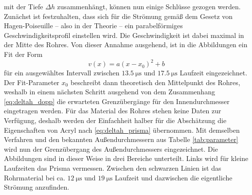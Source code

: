 mit der Tiefe $\Delta h$ zusammenhängt, können nun einige Schlüsse gezogen werden. Zunächst ist festzuhalten, dass sich für die Strömung gemäß dem Gesetz von Hagen-Poiseuille -- also in der Theorie -- ein parabelförmiges Geschwindigkeitsprofil einstellen wird. Die Geschwindigkeit ist dabei maximal in der Mitte des Rohres. Von dieser Annahme ausgehend, ist in die Abbildungen ein Fit der Form
\begin{equation*}
  v(x) = a(x-x_0)^2 + b
\end{equation*}
für ein ausgewähltes Intervall zwischen $\SI{13,5}{\micro\second}$ und $\SI{17,5}{\micro\second}$ Laufzeit eingezeichnet. Der Fit-Parameter $x_0$ beschreibt dann theoretisch den Mittelpunkt des Rohres, weshalb in einem nächsten Schritt ausgehend von dem Zusammenhang \eqref{eq:deltah_dopp} die erwarteten Grenzübergänge für den Innendurchmesser eingetragen werden. Für das Material des Rohres stehen keine Daten zur Verfügung, deshalb werden der Einfachheit halber für die Abschätzung die Eigenschaften von Acryl nach \eqref{eq:deltah_prisma} übernommen. Mit demselben Verfahren und den bekannten Außendurchmessern aus Tabelle \ref{tab:parameter} wird nun der Grenzübergang des Außendurchmessers eingezeichnet.
Die Abbildungen sind in dieser Weise in drei Bereiche unterteilt. Links wird für kleine Laufzeiten das Prisma vermessen. Zwischen den schwarzen Linien ist das Rohrmaterial bei ca. $\SI{12}{\micro\second}$ und $\SI{19}{\micro\second}$ Laufzeit und dazwischen die eigentliche Strömung anzufinden.


